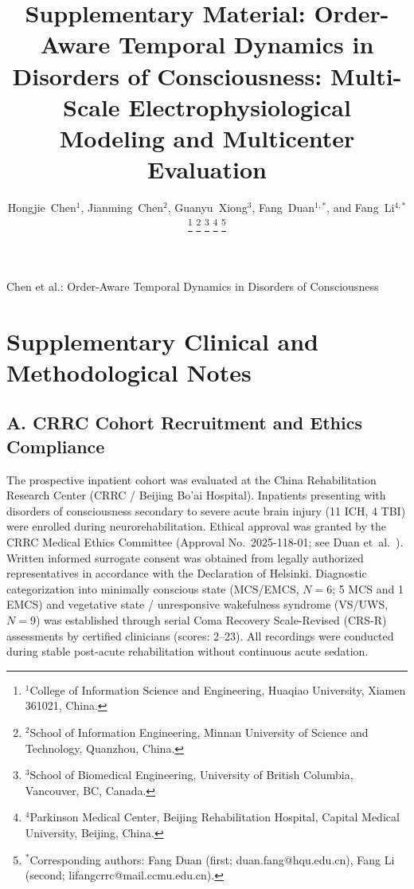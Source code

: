 \documentclass[journal,twoside,web]{ieeecolor}
\begin{document}
\pagestyle{plain}


\title{\fontsize{14pt}{16pt}\selectfont Supplementary Material: Order-Aware Temporal Dynamics in Disorders of Consciousness: Multi-Scale Electrophysiological Modeling and Multicenter Evaluation}

\author{\parbox{\textwidth}{\centering\fontsize{9pt}{11pt}\selectfont Hongjie~Chen$^{1}$, Jianming~Chen$^{2}$, Guanyu~Xiong$^{3}$, Fang~Duan$^{1,*}$, and Fang~Li$^{4,*}$}%
\thanks{$^{1}$College of Information Science and Engineering, Huaqiao University, Xiamen 361021, China.}%
\thanks{$^{2}$School of Information Engineering, Minnan University of Science and Technology, Quanzhou, China.}%
\thanks{$^{3}$School of Biomedical Engineering, University of British Columbia, Vancouver, BC, Canada.}%
\thanks{$^{4}$Parkinson Medical Center, Beijing Rehabilitation Hospital, Capital Medical University, Beijing, China.}%
\thanks{$^{*}$Corresponding authors: Fang Duan (first; duan.fang@hqu.edu.cn), Fang Li (second; lifangcrrc@mail.ccmu.edu.cn).}%
}

%
{Chen et al.: Order-Aware Temporal Dynamics in Disorders of Consciousness}

\maketitle




\section*{Supplementary Clinical and Methodological Notes}
\vspace{-2pt}

\subsection*{A. CRRC Cohort Recruitment and Ethics Compliance}
The prospective inpatient cohort was evaluated at the China Rehabilitation Research Center (CRRC / Beijing Bo'ai Hospital). Inpatients presenting with disorders of consciousness secondary to severe acute brain injury (11 ICH, 4 TBI) were enrolled during neurorehabilitation. Ethical approval was granted by the CRRC Medical Ethics Committee (Approval No.~2025-118-01; see Duan et~al.~\cite{duan2026auditory}). Written informed surrogate consent was obtained from legally authorized representatives in accordance with the Declaration of Helsinki. Diagnostic categorization into minimally conscious state (MCS/EMCS, $N=6$; 5 MCS and 1 EMCS) and vegetative state / unresponsive wakefulness syndrome (VS/UWS, $N=9$) was established through serial Coma Recovery Scale-Revised (CRS-R) assessments by certified clinicians (scores: 2--23). All recordings were conducted during stable post-acute rehabilitation without continuous acute sedation.
\end{document}
